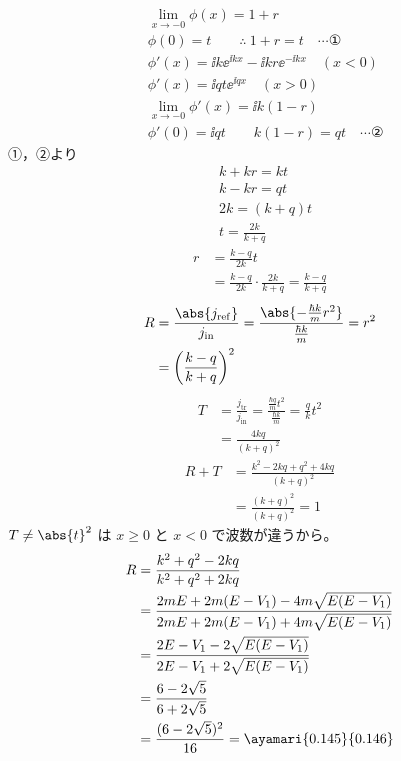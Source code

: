 \begin{align*}
&\lim_{x\to-0}\phi(x)=1+r\\
&\phi(0)=t\qquad\therefore\ 1+r=t\quad\cdots\text{①}\\
&\phi'(x)=\ii k\ee^{\ii kx}-\ii kr\ee^{-\ii kx}\quad(x<0)\\
&\phi'(x)=\ii qt\ee^{\ii qx}\quad(x>0)\\
&\lim_{x\to-0}\phi'(x)=\ii k(1-r)\\
&\phi'(0)=\ii qt\qquad k(1-r)=qt\quad\cdots\text{②}
\end{align*}
①，②より
\begin{align*}
&k+kr=kt\\
&k-kr=qt\\
&2k=(k+q)t\\
&t=\frac{2k}{k+q}
\end{align*}
\begin{align*}
r&=\frac{k-q}{2k}t\\
&=\frac{k-q}{2k}\cdot\frac{2k}{k+q}=\frac{k-q}{k+q}
\end{align*}
\begin{align*}
R&=\frac{\abs{j_{\mathrm{ref}}}}{j_{\mathrm{in}}}=\frac{\abs{-\frac{\hbar k}{m}r^{2}}}{\frac{\hbar k}{m}}=r^{2}\\
&=\left(\frac{k-q}{k+q}\right)^{2}
\end{align*}
\begin{align*}
T&=\frac{j_{\mathrm{tr}}}{j_{\mathrm{in}}}=\frac{\frac{\hbar q}{m}t^{2}}{\frac{\hbar k}{m}}=\frac{q}{k}t^{2}\\
&=\frac{4kq}{(k+q)^{2}}
\end{align*}
\begin{align*}
R+T&=\frac{k^{2}-2kq+q^{2}+4kq}{(k+q)^{2}}\\
&=\frac{(k+q)^{2}}{(k+q)^{2}}=1
\end{align*}
$T\neq\abs{t}^{2}$ は $x\ge0$ と $x<0$ で波数が違うから。
\begin{align*}
R&=\frac{k^{2}+q^{2}-2kq}{k^{2}+q^{2}+2kq}\\
&=\frac{2mE+2m(E-V_{1})-4m\sqrt{E(E-V_{1})}}{2mE+2m(E-V_{1})+4m\sqrt{E(E-V_{1})}}\\
&=\frac{2E-V_{1}-2\sqrt{E(E-V_{1})}}{2E-V_{1}+2\sqrt{E(E-V_{1})}}\\
&=\frac{6-2\sqrt{5}}{6+2\sqrt{5}}\\
&=\frac{(6-2\sqrt{5})^{2}}{16}=\ayamari{0.145}{0.146}
\end{align*}
